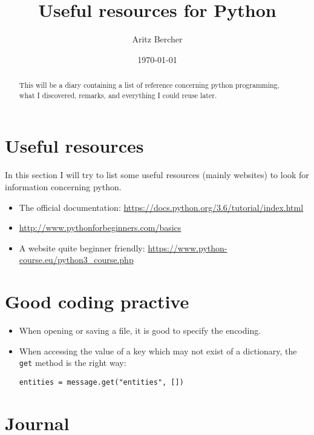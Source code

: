 \documentclass[11pt,a4paper]{article}
\title{Useful resources for Python}
\author{Aritz Bercher}
\date{\today}
\begin{document}
\maketitle

\begin{abstract}
This will be a diary containing a list of reference concerning python programming, what I discovered, remarks, and everything I could reuse later.
\end{abstract}

\tableofcontents

\section{Useful resources}
In this section I will try to list some useful resources (mainly websites) to look for information concerning python.
\begin{itemize}
\item The official documentation: \url{https://docs.python.org/3.6/tutorial/index.html}
\item \url{http://www.pythonforbeginners.com/basics}
\item A website quite beginner friendly: \url{https://www.python-course.eu/python3_course.php}
\end{itemize}

\section{Good coding practive}
\begin{itemize}
\item When opening or saving a file, it is good to specify the encoding.
\item When accessing the value of a key which may not exist of a dictionary, the \texttt{get} method is the right way:
\begin{verbatim}
entities = message.get("entities", [])
\end{verbatim}
\end{itemize}

\section{Journal}
\end{document}
